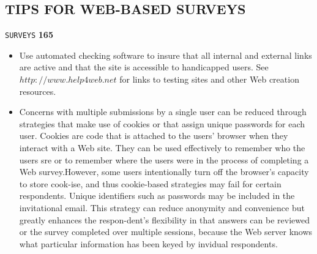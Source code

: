\documentclass[8pt]{beamer}
\begin{document}
\begin{frame}
\section*{TIPS FOR WEB-BASED SURVEYS}
\begin{flushright}
 \texttt{SURVEYS} \hspace*{1cm} \textbf{165}
\end{flushright}

\vspace*{0.5cm}
\begin{itemize}
  \item Use automated checking software to insure that all internal and external links are active and that the site is accessible to handicapped users. See $http://www.help4web.net$ for links to testing sites and other Web creation resources.\\
  \item Concerns with multiple submissions by a single user can be reduced through strategies that make use of cookies or that assign unique passwords for each user. Cookies are code that is attached to the users' browser when they interact with a Web site. They can be used effectively to remember who the users sre or to remember where the users were in the process of completing a Web survey.However, some users intentionally turn off the browser's capacity to store cook-ise, and thus cookie-based strategies may fail for certain respondents. Unique identifiers such as passwords may be included in the invitational email. This strategy can reduce anonymity and convenience but greatly enhances the respon-dent's flexibility in that answers can be reviewed or the survey completed over multiple sessions, because the Web server knows what particular information has been keyed by invidual respondents.\\
\end{itemize}
\end{frame}
\end{document}
